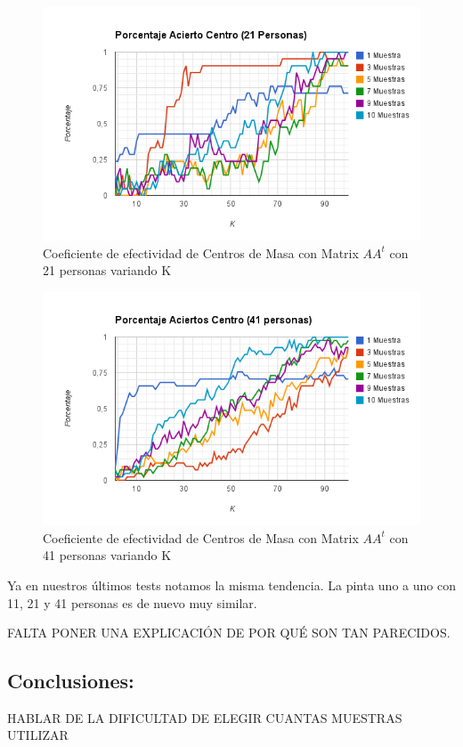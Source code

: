 \begin{figure}[H]
\includegraphics[width=1\textwidth]{img/imagef14.png}
     \caption{Coeficiente de efectividad de Centros de Masa con Matrix $AA^t$ con 21 personas variando K}
\end{figure}

\begin{figure}[H]
\includegraphics[width=1\textwidth]{img/imagef15.png}
     \caption{Coeficiente de efectividad de Centros de Masa  con Matrix $AA^t$ con 41 personas variando K}
\end{figure}


Ya en nuestros últimos tests notamos la misma tendencia. La pinta uno a uno con 11, 21 y 41 personas
es de nuevo muy similar.

FALTA PONER UNA EXPLICACIÓN DE POR QUÉ SON TAN PARECIDOS.

\subsection{Conclusiones:}

HABLAR DE LA DIFICULTAD DE ELEGIR CUANTAS MUESTRAS UTILIZAR
